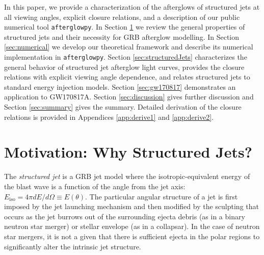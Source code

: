 \documentclass[twocolumn]{aastex62}
\newcommand{\gwbns}{GW170817A}
\newcommand{\afterglowpy}{{\tt afterglowpy}}
\newcommand{\Eiso}{\ensuremath{E_{\mathrm{iso}}}}
\begin{document}
In this paper, we provide a characterization of the afterglows of structured jets at all viewing angles, explicit closure relations, and a description of our  public numerical tool \afterglowpy{}. In Section \ref{sec:motivation} we review the general properties of structured jets and their necessity for GRB afterglow modelling.  In Section \ref{sec:numerical} we develop our theoretical framework and describe its numerical implementation in \afterglowpy{}.  Section \ref{sec:structuredJets} characterizes the general behavior of structured jet afterglow light curves, provides the closure relations with explicit viewing angle dependence, and relates structured jets to standard energy injection models.  Section \ref{sec:gw170817} demonstrates an application to \gwbns{}. Section \ref{sec:discussion} gives further discussion and Section \ref{sec:summary} gives the summary.  Detailed derivation of the closure relations is provided in Appendices \ref{app:derive1} and \ref{app:derive2}.



%
%


\section{Motivation: Why Structured Jets?}\label{sec:motivation}

The \emph{structured jet} is a GRB jet model where the isotropic-equivalent energy of the blast wave is a function of the angle from the jet axis: $\Eiso = 4\pi dE/d\Omega \equiv E(\theta)$. The particular angular structure of a jet is first imposed by the jet launching mechanism and then modified by the sculpting that occurs as the jet burrows out of the surrounding ejecta debris (as in a binary neutron star merger) or stellar envelope (as in a collapsar).  In the case of neutron star mergers, it is not a given that there is sufficient ejecta in the polar regions to significantly alter the intrinsic jet structure.
\end{document}
